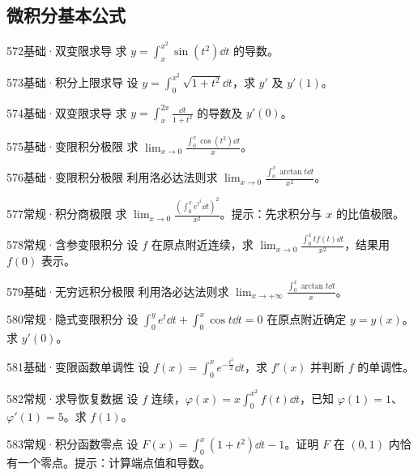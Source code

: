 \subsection{微积分基本公式}
\begin{exercise}{572}{基础·双变限求导}
求 $y=\int_x^{x^2}\sin(t^2)\dd t$ 的导数。
\end{exercise}
\begin{exercise}{573}{基础·积分上限求导}
设 $y=\int_0^{x^2}\sqrt{1+t^2}\dd t$，求 $y'$ 及 $y'(1)$。
\end{exercise}
\begin{exercise}{574}{基础·双变限求导}
求 $y=\int_x^{2x}\frac{\dd t}{1+t^2}$ 的导数及 $y'(0)$。
\end{exercise}
\begin{exercise}{575}{基础·变限积分极限}
求 $\lim_{x\to0}\frac{\int_0^x\cos(t^2)\dd t}{x}$。
\end{exercise}
\begin{exercise}{576}{基础·变限积分极限}
利用洛必达法则求 $\lim_{x\to0}\frac{\int_0^x\arctan t\dd t}{x^2}$。
\end{exercise}
\begin{exercise}{577}{常规·积分商极限}
求 $\lim_{x\to0}\frac{(\int_0^xe^{t^2}\dd t)^2}{x^2}$。提示：先求积分与 $x$ 的比值极限。
\end{exercise}
\begin{exercise}{578}{常规·含参变限积分}
设 $f$ 在原点附近连续，求 $\lim_{x\to0}\frac{\int_0^x tf(t)\dd t}{x^2}$，结果用 $f(0)$ 表示。
\end{exercise}
\begin{exercise}{579}{基础·无穷远积分极限}
利用洛必达法则求 $\lim_{x\to+\infty}\frac{\int_0^x\arctan t\dd t}{x}$。
\end{exercise}
\begin{exercise}{580}{常规·隐式变限积分}
设 $\int_0^ye^t\dd t+\int_0^x\cos t\dd t=0$ 在原点附近确定 $y=y(x)$。求 $y'(0)$。
\end{exercise}
\begin{exercise}{581}{基础·变限函数单调性}
设 $f(x)=\int_0^xe^{-\frac{t^2}{2}}\dd t$，求 $f'(x)$ 并判断 $f$ 的单调性。
\end{exercise}
\begin{exercise}{582}{常规·求导恢复数据}
设 $f$ 连续，$\varphi(x)=x\int_0^{x^2}f(t)\dd t$，已知 $\varphi(1)=1$、$\varphi'(1)=5$。求 $f(1)$。
\end{exercise}
\begin{exercise}{583}{常规·积分函数零点}
设 $F(x)=\int_0^x(1+t^2)\dd t-1$。证明 $F$ 在 $(0,1)$ 内恰有一个零点。提示：计算端点值和导数。
\end{exercise}
